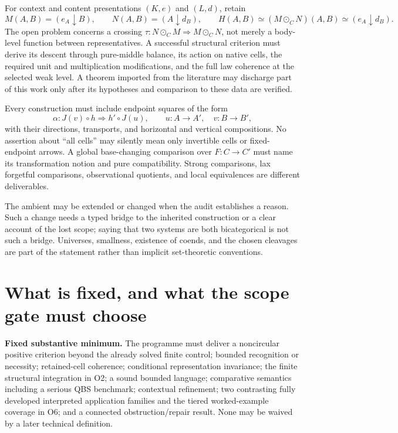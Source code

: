 \documentclass[11pt,a4paper]{article}
\begin{document}
For context and content presentations \((K,e)\) and \((L,d)\), retain
\[
 M(A,B)=(e_A\downarrow B),\qquad
 N(A,B)=(A\downarrow d_B),\qquad
 H(A,B)\simeq(M\odot_C N)(A,B)\simeq(e_A\downarrow d_B).
\]
The open problem concerns a crossing
\(\tau:N\odot_C M\Rightarrow M\odot_C N\), not merely a body-level
function between representatives. A successful structural criterion must
derive its descent through pure-middle balance, its action on native cells,
the required unit and multiplication modifications, and the full law
coherence at the selected weak level. A theorem imported from the literature
may discharge part of this work only after its hypotheses and comparison to
these data are verified.

Every construction must include endpoint squares of the form
\[
 \alpha:J(v)\circ h\Longrightarrow h'\circ J(u),
 \qquad u:A\to A',\quad v:B\to B',
\]
with their directions, transports, and horizontal and vertical compositions.
No assertion about ``all cells'' may silently mean only invertible cells or
fixed-endpoint arrows. A global base-changing comparison over \(F:C\to C'\)
must name its transformation notion and pure compatibility. Strong
comparisons, lax forgetful comparisons, observational quotients, and local
equivalences are different deliverables.

The ambient may be extended or changed when the audit establishes a reason.
Such a change needs a typed bridge to the inherited construction or a clear
account of the lost scope; saying that two systems are both bicategorical is
not such a bridge. Universes, smallness, existence of coends, and the chosen
cleavages are part of the statement rather than implicit set-theoretic
conventions.

\section{What is fixed, and what the scope gate must choose}\label{sec:scope}

\textbf{Fixed substantive minimum.} The programme must deliver a noncircular
positive criterion beyond the already solved finite control; bounded
recognition or necessity; retained-cell coherence; conditional representation
invariance; the finite structural integration in O2; a sound bounded language;
comparative semantics including a serious QBS benchmark; contextual refinement;
two contrasting fully developed interpreted application families and the
tiered worked-example coverage in O6; and a connected obstruction/repair
result. None may be waived by a later technical definition.
\end{document}
